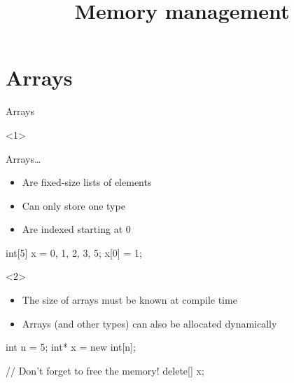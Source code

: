 

\title{Memory management}



\maketitle

\section{Arrays}

\begin{frame}[fragile,t]{Arrays}
    \begin{onlyenv}<1>
        \begin{block}{Arrays\ldots}
            \begin{itemize}
                \item Are \alert{fixed\hyp{}size} lists of elements
                \item Can only store one type
                \item Are indexed starting at 0
            \end{itemize}
        \end{block}
        \begin{cpp}
            int[5] x = {0, 1, 2, 3, 5};
            x[0] = 1;
        \end{cpp}
    \end{onlyenv}
    \begin{onlyenv}<2>
        \begin{itemize}
            \item The size of arrays must be known at compile time
            \item Arrays (and other types) can also be
                  \alert{allocated dynamically}
        \end{itemize}
        \begin{cpp}
            int n = 5;
            int* x = new int[n];

            // Don't forget to free the memory!
            delete[] x;
        \end{cpp}
    \end{onlyenv}
\end{frame}

